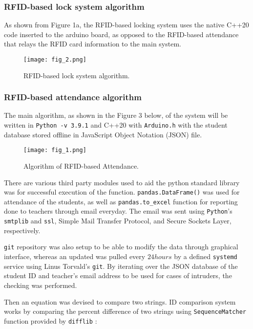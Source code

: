 \documentclass[12pt]{article}
\begin{document}
\subsubsection*{RFID-based lock system algorithm}

As shown from Figure 1a, the RFID-based locking system uses the native C++20 code inserted to the arduino board, as opposed to the RFID-based attendance that relays the RFID card information to the main system.

\begin{figure}[h!]
	\centering
	\texttt{[image: fig\_2.png]}
	\caption{RFID-based lock system algorithm.}
\end{figure}

\subsubsection*{RFID-based attendance algorithm}

The main algorithm, as shown in the Figure 3 below, of the system will be written in \texttt{Python -v 3.9.1} and C++20 with \texttt{Arduino.h} with the student database stored offline in JavaScript Object Notation (JSON) file.

\begin{figure}[h!]
	\centering
	\texttt{[image: fig\_1.png]}
	\caption{Algorithm of RFID-based Attendance.} \label{fig:4}
\end{figure}

There are various third party modules used to aid the python standard library was for successful execution of the function. \texttt{pandas.DataFrame()} was used for attendance of the students, as well as \texttt{pandas.to\_excel} function for reporting done to teachers through email everyday. The email was sent using \texttt{Python}'s \texttt{smtplib} and \texttt{ssl}, Simple Mail Transfer Protocol, and Secure Sockets Layer, respectively.

\texttt{git} repository was also setup to be able to modify the data through graphical interface, whereas an updated was pulled every $24 hours$ by a defined \texttt{systemd} service using Linus Torvald's \texttt{git}. By iterating over the JSON database of the student ID and teacher's email address to be used for cases of intruders, the checking was performed.

Then an equation was devised to compare two strings. ID comparison system works by comparing the percent difference of two strings using \texttt{SequenceMatcher} function provided by \texttt{difflib} :
\end{document}
